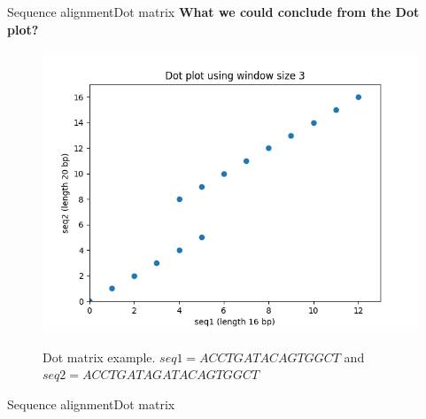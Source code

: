\documentclass[10pt]{beamer}
\begin{document}
{%
\begin{frame}{Sequence alignment}{Dot matrix}
	\centering
	\textbf{What we could conclude from the Dot plot?}	 
	\begin{figure}[]		
		\includegraphics[width=\textwidth,height=0.5\textheight,keepaspectratio]{img/alignment/dot_plot3.png}
		\label{img:uniprot}
		\caption{Dot matrix example. $seq1 = ACCTGATACAGTGGCT$ and $seq2 = ACCTGATAGATACAGTGGCT$}
	\end{figure}
\end{frame}

\begin{frame}{Sequence alignment}{Dot matrix}
	

\end{frame}}
\end{document}
